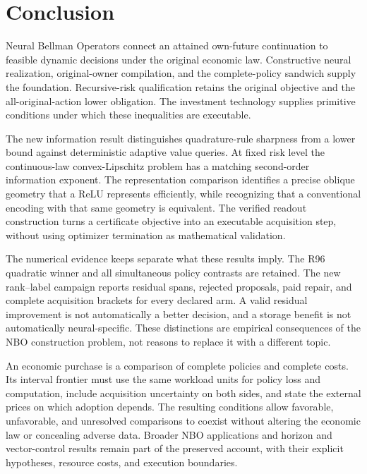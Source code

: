 \section{Conclusion}\label{sec:conclusion65}
Neural Bellman Operators connect an attained own-future continuation to feasible dynamic decisions under the original economic law. Constructive neural realization, original-owner compilation, and the complete-policy sandwich supply the foundation. Recursive-risk qualification retains the original objective and the all-original-action lower obligation. The investment technology supplies primitive conditions under which these inequalities are executable.

The new information result distinguishes quadrature-rule sharpness from a lower bound against deterministic adaptive value queries. At fixed risk level the continuous-law convex-Lipschitz problem has a matching second-order information exponent. The representation comparison identifies a precise oblique geometry that a ReLU represents efficiently, while recognizing that a conventional encoding with that same geometry is equivalent. The verified readout construction turns a certificate objective into an executable acquisition step, without using optimizer termination as mathematical validation.

The numerical evidence keeps separate what these results imply. The R96 quadratic winner and all simultaneous policy contrasts are retained. The new rank--label campaign reports residual spans, rejected proposals, paid repair, and complete acquisition brackets for every declared arm. A valid residual improvement is not automatically a better decision, and a storage benefit is not automatically neural-specific. These distinctions are empirical consequences of the NBO construction problem, not reasons to replace it with a different topic.

An economic purchase is a comparison of complete policies and complete costs. Its interval frontier must use the same workload units for policy loss and computation, include acquisition uncertainty on both sides, and state the external prices on which adoption depends. The resulting conditions allow favorable, unfavorable, and unresolved comparisons to coexist without altering the economic law or concealing adverse data. Broader NBO applications and horizon and vector-control results remain part of the preserved account, with their explicit hypotheses, resource costs, and execution boundaries.
